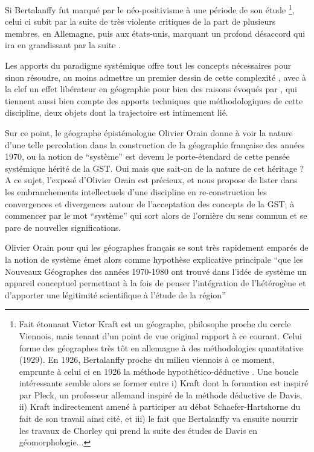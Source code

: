 {Si Bertalanffy fut marqué par le néo-positivisme à une période de son étude \footnote{Fait étonnant Victor Kraft est un géographe, philosophe proche du cercle Viennois, mais tenant d'un point de vue original rapport à ce courant. Celui forme des géographes très tôt en allemagne à des méthodologies quantitative (1929). En 1926, Bertalanffy proche du milieu viennois à ce moment, emprunte à celui ci en 1926 la méthode hypothético-déductive \autocite[342]{Pouvreau2013}. Une boucle intéressante semble alors se former entre i) Kraft dont la formation est inspiré par Pleck, un professeur allemand inspiré de la méthode déductive de Davis, ii) Kraft indirectement amené à participer au débat Schaefer-Hartshorne du fait de son travail ainsi cité, et iii) le fait que Bertalanffy va ensuite nourrir les travaux de Chorley qui prend la suite des études de Davis en géomorphologie...}, celui ci subit par la suite de très violente critiques de la part de plusieurs membres, en Allemagne, puis aux états-unis, marquant un profond désaccord qui ira en grandissant par la suite \autocite[26-27]{Pouvreau2006}.

Les apports du paradigme systémique offre tout les concepts nécessaires pour sinon résoudre, au moins admettre un premier dessin de cette complexité \autocite{Dauphine2003}, avec à la clef un effet libérateur en géographie pour bien des raisons évoqués par \textcite[27-28]{Pumain2003}, qui tiennent aussi bien compte des apports techniques que méthodologiques de cette discipline, deux objets dont la trajectoire est intimement lié. 

Sur ce point, le géographe épistémologue Olivier Orain \autocite{Orain2001} donne à voir la nature d'une telle percolation dans la construction de la géographie française des années 1970, ou la notion de \enquote{système} est devenu le porte-étendard de cette pensée systémique hérité de la GST. Oui mais que sait-on de la nature de cet héritage ? A ce sujet, l'exposé d'Olivier Orain est précieux, et nous propose de lister dans les embranchements intellectuels d'une discipline en re-construction les convergences et divergences autour de l'acceptation des concepts de la GST; à commencer par le mot \enquote{système} qui sort alors de l'ornière du sens commun et se pare de nouvelles significations.

Olivier Orain pour qui les géographes français se sont très rapidement emparés de la notion de système émet alors comme hypothèse explicative principale \enquote{que les Nouveaux Géographes des années 1970-1980 ont trouvé dans l’idée de système un appareil conceptuel permettant à la fois de penser l’intégration de l’hétérogène et d’apporter une légitimité scientifique à l’étude de la région} \autocite[23]{Orain2001} %

}
